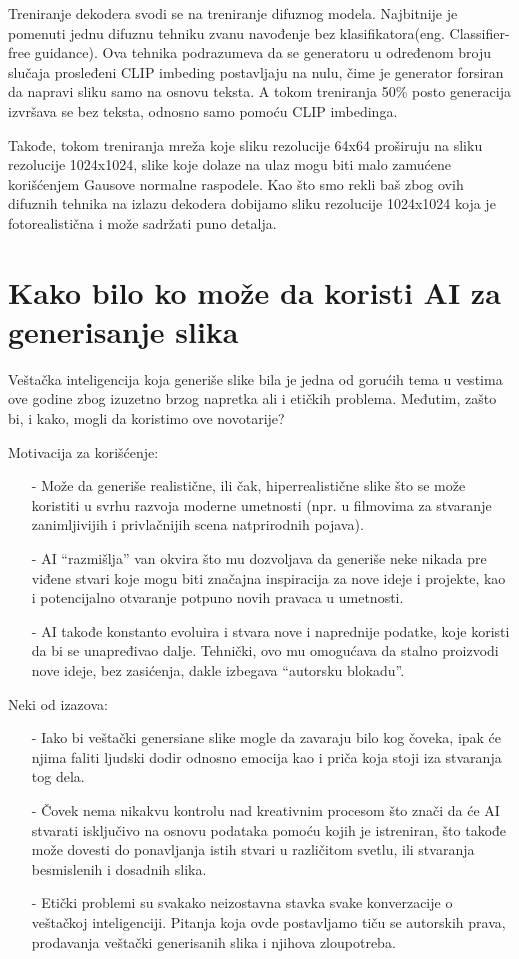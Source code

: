 \documentclass[12pt, letterpaper]{article}
\begin{document}
Treniranje dekodera svodi se na treniranje difuznog modela. Najbitnije je pomenuti jednu difuznu tehniku zvanu navođenje bez klasifikatora(eng. Classifier-free guidance). Ova tehnika podrazumeva da se generatoru u određenom broju slučaja prosleđeni CLIP imbeding postavljaju na nulu, čime je generator forsiran da napravi sliku samo na osnovu teksta. A tokom treniranja 50\% posto generacija izvršava se bez teksta, odnosno samo pomoću CLIP imbedinga.

Takođe, tokom treniranja mreža koje sliku rezolucije 64x64 proširuju na sliku rezolucije 1024x1024, slike koje dolaze na ulaz mogu biti malo zamućene korišćenjem Gausove normalne raspodele. Kao što smo rekli baš zbog ovih difuznih tehnika na izlazu dekodera dobijamo sliku rezolucije 1024x1024 koja je fotorealistična i može sadržati puno detalja.\cite{openai_dali}

\pagebreak

\section{Kako bilo ko može da koristi AI za generisanje slika}
Veštačka inteligencija koja generiše slike bila je jedna od gorućih tema u vestima ove godine zbog izuzetno brzog napretka ali i etičkih problema. Međutim, zašto bi, i kako, mogli da koristimo ove novotarije?

Motivacija za korišćenje:
\begin{itemize}
  \item[-] Može da generiše realistične, ili čak, hiperrealistične slike što se može koristiti u svrhu razvoja moderne umetnosti (npr. u filmovima za stvaranje zanimljivijih i privlačnijih scena natprirodnih pojava).
  \item[-] AI “razmišlja” van okvira što mu dozvoljava da generiše neke nikada pre viđene stvari koje mogu biti značajna inspiracija za nove ideje i projekte, kao i potencijalno otvaranje potpuno novih pravaca u umetnosti.
  \item[-] AI takođe konstanto evoluira i stvara nove i naprednije podatke, koje koristi da bi se unapređivao dalje. Tehnički, ovo mu omogućava da stalno proizvodi nove ideje, bez zasićenja, dakle izbegava “autorsku blokadu”.
\end{itemize}

Neki od izazova:
\begin{itemize}
    \item[-] Iako bi veštački genersiane slike mogle da zavaraju bilo kog čoveka, ipak će njima faliti ljudski dodir odnosno emocija kao i priča koja stoji iza stvaranja tog dela.
    \item[-] Čovek nema nikakvu kontrolu nad kreativnim procesom što znači da će AI stvarati isključivo na osnovu podataka pomoću kojih je istreniran, što takođe može dovesti do ponavljanja istih stvari u različitom svetlu, ili stvaranja besmislenih i dosadnih slika.
    \item[-] Etički problemi su svakako neizostavna stavka svake konverzacije o veštačkoj inteligenciji. Pitanja koja ovde postavljamo tiču se autorskih prava, prodavanja veštački generisanih slika i njihova zloupotreba. 
\end{itemize}
\end{document}
